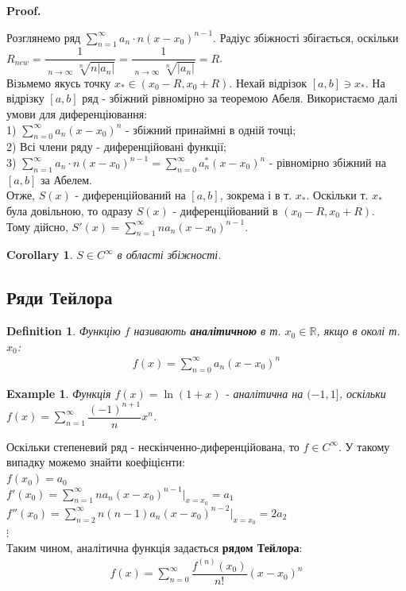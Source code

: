 \documentclass[a4paper, 10pt]{article}
\makeatletter
\DeclareMathOperator*\uplim{\overline{lim}}
\def\huge{\displaystyle}
\def\qed{$\blacksquare$}
\theoremstyle{theoremdd}
\theoremstyle{theoremdd}
\theoremstyle{theoremdd}
\newtheorem{definition}[theorem]{Definition}
\theoremstyle{theoremdd}
\theoremstyle{theoremdd}
\newtheorem{example}[theorem]{Example}
\theoremstyle{theoremdd}
\theoremstyle{theoremdd}
\theoremstyle{theoremdd}
\theoremstyle{theoremdd}
\newtheorem{corollary}[theorem]{Corollary}
\renewenvironment{proof}[1][Proof.\\]{\par
\pushQED{\hfill \qed}%
\normalfont \topsep6\p@\@plus6\p@\relax
\trivlist
\item\relax
{\bfseries
#1\@addpunct{.}}\hspace\labelsep\ignorespaces
}{%
\popQED\endtrivlist\@endpefalse
}
\makeatother
\begin{document}
\begin{proof}
Розглянемо ряд $\huge \sum_{n=1}^\infty a_n\cdot n(x-x_0)^{n-1}$. Радіус збіжності збігається, оскільки\\
$ R_{new} = \dfrac{1}{\huge \uplim_{n \to \infty} \sqrt[n]{n |a_n|}} = \dfrac{1}{\huge \uplim_{n \to \infty} \sqrt[n]{|a_n|}} = R$.\\
Візьмемо якусь точку $x_* \in (x_0-R,x_0+R)$. Нехай відрізок $[a,b] \ni x_*$. На відрізку $[a,b]$ ряд - збіжний рівномірно за теоремою Абеля. Використаємо далі умови для диференціювання:\\
1) $\huge \sum_{n=0}^\infty a_n(x-x_0)^n$ - збіжний принаймні в одній точці;\\
2) Всі члени ряду - диференційовані функції;\\
3) $\huge \sum_{n=1}^\infty a_n \cdot n(x-x_0)^{n-1} = \huge\sum_{n=0}^\infty a_n^* (x-x_0)^n$ - рівномірно збіжний на $[a,b]$ за Абелем.\\
Отже, $S(x)$ - диференційований на $[a,b]$, зокрема і в т. $x_*$. Оскільки т. $x_*$ була довільною, то одразу $S(x)$ - диференційований в $(x_0-R,x_0+R)$.\\
Тому дійсно, $S'(x) = \huge \sum_{n=1}^\infty n a_n (x-x_0)^{n-1}$.
\end{proof}

\begin{corollary}
$S \in C^{\infty}$ в області збіжності.
\end{corollary}

\subsection{Ряди Тейлора}
\begin{definition}
Функцію $f$ називають \textbf{аналітичною} в т. $x_0 \in \mathbb{R}$, якщо в околі т. $x_0$:
\begin{align*}
f(x) = \huge\sum_{n=0}^\infty a_n(x-x_0)^n
\end{align*}
\end{definition}

\begin{example}
Функція $f(x) = \ln (1+x)$ - аналітична на $(-1,1]$, оскільки $f(x) = \huge\sum_{n=1}^\infty \dfrac{(-1)^{n+1}}{n} x^n$.
\end{example}

Оскільки степеневий ряд - нескінченно-диференційована, то $f \in C^\infty$. У такому випадку можемо знайти коефіцієнти:\\
$f(x_0) = a_0$\\
$f'(x_0) = \huge\sum_{n=1}^\infty n a_n(x-x_0)^{n-1} |_{x=x_0} = a_1$\\
$f''(x_0) = \huge\sum_{n=2}^\infty n(n-1) a_n(x-x_0)^{n-2} |_{x=x_0} = 2a_2$\\
$\vdots$\\
Таким чином, аналітична функція задається \textbf{рядом Тейлора}:
\begin{align*}
f(x) = \huge\sum_{n=0}^\infty \dfrac{f^{(n)}(x_0)}{n!}(x-x_0)^n
\end{align*}
\end{document}
